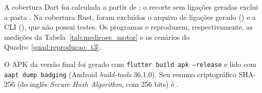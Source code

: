 A cobertura Dart foi calculada a partir de ; o recorte sem
ligações geradas exclui a pasta . Na cobertura Rust, foram
excluídos o arquivo de ligações gerado () e a CLI
(), que não possui testes. Os programas
 e 
reproduzem, respectivamente, as medições da Tabela~\ref{tab:medicoes_motor} e os
cenários do Quadro~\ref{quad:reproducao_t3}.

O APK da versão final foi gerado com \texttt{flutter build apk --release} e lido com
\texttt{aapt dump badging} (Android \textit{build-tools} 36.1.0). Seu resumo
criptográfico SHA-256 (do inglês \textit{Secure Hash Algorithm}, com 256 bits) é
.
